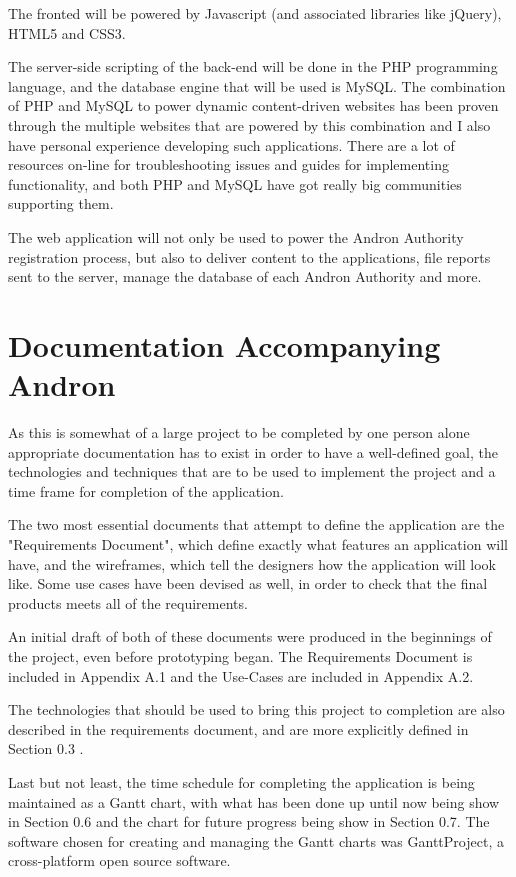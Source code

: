 \documentclass[12pt]{ecsproject}     %
\begin{document}
The fronted will be powered by Javascript (and associated libraries like jQuery), HTML5 and CSS3. 

The server-side scripting of the back-end will be done in the PHP programming language, and the database engine that will be used is MySQL. The combination of PHP and MySQL to power dynamic content-driven websites has been proven through the multiple websites that are powered by this combination and I also have personal experience developing such applications. There are a lot of resources on-line for troubleshooting issues and guides for implementing functionality, and both PHP and MySQL have got really big communities supporting them.

The web application will not only be used to power the Andron Authority registration process, but also to deliver content to the applications, file reports sent to the server, manage the database of each Andron Authority and more.

\pagebreak
\section{Documentation Accompanying Andron}

As this is somewhat of a large project to be completed by one person alone appropriate documentation has to exist in order to have a well-defined goal, the technologies and techniques that are to be used to implement the project and a time frame for completion of the application.

The two most essential documents that attempt to define the application are the "Requirements Document", which define exactly what features an application will have, and the wireframes, which tell the designers how the application will look like. Some use cases have been devised as well, in order to check that the final products meets all of the requirements.

An initial draft of both of these documents were produced in the beginnings of the project, even before prototyping began. The Requirements Document is included in Appendix A.1 and the Use-Cases are included in Appendix A.2.

The technologies that should be used to bring this project to completion are also described in the requirements document, and are more explicitly defined in Section 0.3 .

Last but not least, the time schedule for completing the application is being maintained as a Gantt chart, with what has been done up until now being show in Section 0.6 and the chart for future progress being show in Section 0.7. The software chosen for creating and managing the Gantt charts was GanttProject, a cross-platform open source software.
\end{document}
